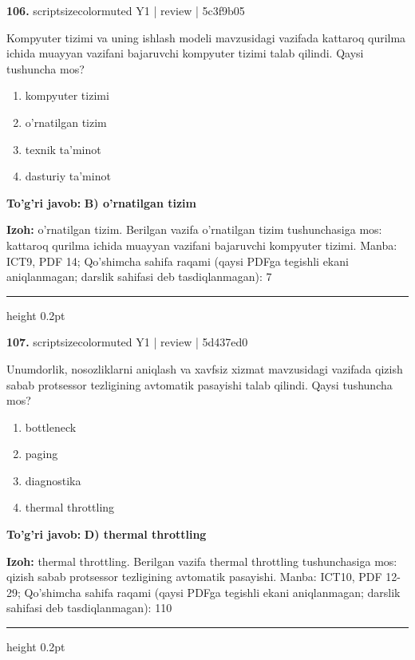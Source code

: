 \documentclass[10pt,a4paper]{article}
\begin{document}
{\bfseries\sffamily\color{ink} 106.} {scriptsizecolor{muted} Y1 | review | 5c3f9b05}
\par
Kompyuter tizimi va uning ishlash modeli mavzusidagi vazifada kattaroq qurilma ichida muayyan vazifani bajaruvchi kompyuter tizimi talab qilindi. Qaysi tushuncha mos?
\begin{enumerate}[label=\Alph*),leftmargin=9mm]
\item kompyuter tizimi
\item o'rnatilgan tizim
\item texnik ta'minot
\item dasturiy ta'minot
\end{enumerate}
\begin{tcolorbox}[enhanced,breakable,colback=teal!4,colframe=teal!60!black,boxrule=0.45pt,arc=1.2mm,left=2.7mm,right=2.7mm,top=1.8mm,bottom=1.8mm,before skip=2mm,after skip=2mm]
{\bfseries\sffamily\color{teal}To'g'ri javob:} \textbf{B) o'rnatilgan tizim}
\par\smallskip
{\bfseries Izoh:} o'rnatilgan tizim. Berilgan vazifa o'rnatilgan tizim tushunchasiga mos: kattaroq qurilma ichida muayyan vazifani bajaruvchi kompyuter tizimi. Manba: ICT9, PDF 14; Qo'shimcha sahifa raqami (qaysi PDFga tegishli ekani aniqlanmagan; darslik sahifasi deb tasdiqlanmagan): 7
\end{tcolorbox}
\vspace{2mm}\hrule height 0.2pt\vspace{3mm}

{\bfseries\sffamily\color{ink} 107.} {scriptsizecolor{muted} Y1 | review | 5d437ed0}
\par
Unumdorlik, nosozliklarni aniqlash va xavfsiz xizmat mavzusidagi vazifada qizish sabab protsessor tezligining avtomatik pasayishi talab qilindi. Qaysi tushuncha mos?
\begin{enumerate}[label=\Alph*),leftmargin=9mm]
\item bottleneck
\item paging
\item diagnostika
\item thermal throttling
\end{enumerate}
\begin{tcolorbox}[enhanced,breakable,colback=teal!4,colframe=teal!60!black,boxrule=0.45pt,arc=1.2mm,left=2.7mm,right=2.7mm,top=1.8mm,bottom=1.8mm,before skip=2mm,after skip=2mm]
{\bfseries\sffamily\color{teal}To'g'ri javob:} \textbf{D) thermal throttling}
\par\smallskip
{\bfseries Izoh:} thermal throttling. Berilgan vazifa thermal throttling tushunchasiga mos: qizish sabab protsessor tezligining avtomatik pasayishi. Manba: ICT10, PDF 12-29; Qo'shimcha sahifa raqami (qaysi PDFga tegishli ekani aniqlanmagan; darslik sahifasi deb tasdiqlanmagan): 110
\end{tcolorbox}
\vspace{2mm}\hrule height 0.2pt\vspace{3mm}
\end{document}
